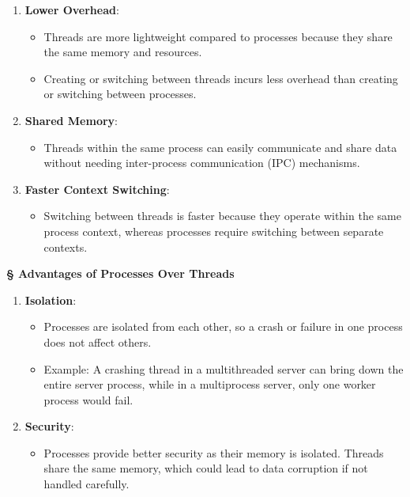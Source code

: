 \documentclass[a4paper]{book}
\newcommand{\sfbf}[1]{{\normalsize\textsf{\textbf{§ #1}}}}
\begin{document}
\begin{enumerate}
\item 
\textbf{Lower Overhead}:
\begin{itemize}
\item 
Threads are more lightweight compared to processes because they share the same memory and resources.

\item 
Creating or switching between threads incurs less overhead than creating or switching between processes.

\end{itemize}

\item 

\textbf{Shared Memory}:

\begin{itemize}
\item 
Threads within the same process can easily communicate and share data without needing inter-process communication (IPC) mechanisms.

\end{itemize}

\item 
\textbf{Faster Context Switching}:
\begin{itemize}
\item 
Switching between threads is faster because they operate within the same process context, whereas processes require switching between separate contexts.

\end{itemize}

\end{enumerate}

\hrulefill

\sfbf{Advantages of Processes Over Threads}

\begin{enumerate}
\item 
\textbf{Isolation}:
\begin{itemize}
\item 
Processes are isolated from each other, so a crash or failure in one process does not affect others.

\item 
Example: A crashing thread in a multithreaded server can bring down the entire server process, while in a multiprocess server, only one worker process would fail.

\end{itemize}

\item 
\textbf{Security}:
\begin{itemize}
\item 
Processes provide better security as their memory is isolated. Threads share the same memory, which could lead to data corruption if not handled carefully.

\end{itemize}

\end{enumerate}
\end{document}
